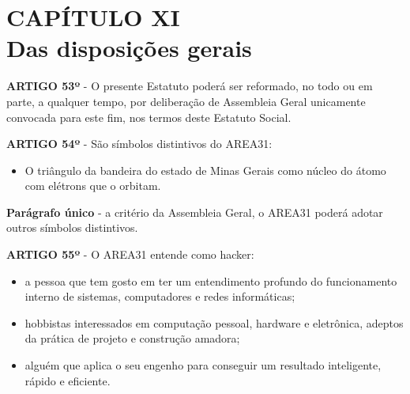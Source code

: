 \chapter*{CAPÍTULO XI \\ Das disposições gerais}


\textbf{ARTIGO 53º} - O presente Estatuto poderá ser reformado, no todo ou 
em parte, a qualquer tempo, por deliberação de Assembleia Geral unicamente 
convocada para este fim, nos termos deste Estatuto Social.

\bigskip

\textbf{ARTIGO 54º} - São símbolos distintivos do AREA31:
	
\begin{itemize}
    \item O triângulo da bandeira do estado de Minas Gerais como núcleo 
        do átomo com elétrons que o orbitam.
\end{itemize}

\textbf{Parágrafo único} - a critério da Assembleia Geral, o AREA31 poderá 
adotar outros símbolos distintivos.

\bigskip

\textbf{ARTIGO 55º} - O AREA31 entende como hacker:

\begin{itemize}
	\item a pessoa que tem gosto em ter um entendimento profundo do 
        funcionamento interno de sistemas, computadores e redes informáticas;
	\item hobbistas interessados em computação pessoal, hardware e 
        eletrônica, adeptos da prática de projeto e construção amadora;
	\item alguém que aplica o seu engenho para conseguir um resultado 
        inteligente, rápido e eficiente.
\end{itemize}
